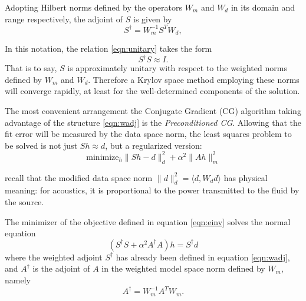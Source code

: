 \documentclass[georeport,12pt]{geophysics}
\begin{document}
Adopting Hilbert norms defined by the operators $W_m$ and $W_d$ in its
domain and range respectively, the adjoint of $S$ is given by
\begin{equation}
\label{eqn:wadj}
S^{\dagger} = W_m^{-1}S^TW_d,
\end{equation}

In this notation, the relation \ref{eqn:unitary} takes the form
\begin{equation}
  \label{eqn:wunitary}
  S^{\dagger}S \approx I.
\end{equation}
That is to say, $S$ is approximately unitary with respect to the
weighted norms defined by $W_m$ and $W_d$. Therefore a Krylov space
method employing these norms will converge rapidly, at least for the
well-determined components of the solution.

The most convenient arrangement the Conjugate Gradient (CG) algorithm
taking advantage of the structure \ref{eqn:wadj} is the {\em
  Preconditioned CG}. Allowing that the fit error will be measured by
the data space norm, the least squares problem to be solved is not
just $Sh \approx d$, but a regularized version:
\begin{equation}
  \label{eqn:einv}
  \mbox{minimize}_h \|Sh-d\|^2_d + \alpha^2 \|Ah\|^2_m
\end{equation}

 recall that the modified data space norm $\|d\|_d^2 = \langle
d, W_d d\rangle$ has physical meaning: for acoustics, it is
proportional to the power transmitted to the fluid by the source.

The minimizer of the objective defined in equation \ref{eqn:einv}
solves the normal equation
\begin{equation}
  \label{eqn:norm0}
  (S^{\dagger}S + \alpha^2 A^{\dagger}A)h = S^{\dagger}d 
\end{equation}
where the weighted adjoint $S^{\dagger}$ has already been defined in equation \ref{eqn:wadj}, and $A^{\dagger}$ is the adjoint of $A$ in the weighted model space norm defined by $W_m$, namely
\begin{equation}
  \label{eqn:aadj}
  A^{\dagger} = W_m^{-1}A^TW_m.
\end{equation}
\end{document}
